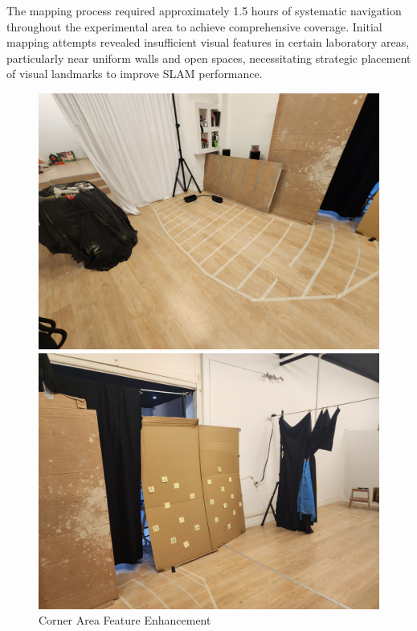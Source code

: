 The mapping process required approximately 1.5 hours of systematic navigation throughout the experimental area to achieve comprehensive coverage. Initial mapping attempts revealed insufficient visual features in certain laboratory areas, particularly near uniform walls and open spaces, necessitating strategic placement of visual landmarks to improve SLAM performance.

\begin{figure}[H]
    \centering
    \begin{minipage}{0.32\textwidth}
        \centering
        \includegraphics[width=\textwidth]{Images/LabVisualAids (5).jpg}
        \caption{Corner Area Feature Enhancement}
        \label{fig:corner_features}
    \end{minipage}
    \hfill
    \begin{minipage}{0.32\textwidth}
        \centering
        \includegraphics[width=\textwidth]{Images/LabVisualAids.jpg}

\end{minipage}
\end{figure}
